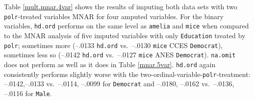 \documentclass[12pt,econ]{sources/authesis}
\begin{document}
Table \ref{mult.mnar.4var} shows the results of imputing both data sets with two \texttt{polr}-treated variables MNAR for four amputed variables. For the binary variables, \texttt{hd.ord} performs on the same level as \texttt{amelia} and \texttt{mice} when compared to the MNAR analysis of five imputed variables with only \texttt{Education} treated by \texttt{polr}; sometimes more (--.0133 \texttt{hd.ord} vs.~--.0130 \texttt{mice} CCES \texttt{Democrat}), sometimes less so (--.0142 \texttt{hd.ord} vs.~--.0127 \texttt{mice} ANES \texttt{Democrat}). \texttt{na.omit} does not perform as well as it does in Table \ref{mnar.5var}. \texttt{hd.ord} again consistently performs slightly worse with the two-ordinal-variable-\texttt{polr}-treatment: --.0142,--.0133 vs.~--.0114, --.0099 for \texttt{Democrat} and --.0180, --.0162 vs.~--.0136, --.0116 for \texttt{Male}.
\end{document}
